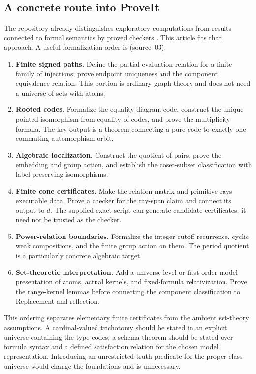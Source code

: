 \documentclass[11pt,letterpaper]{article}
\numberwithin{equation}{section}
\theoremstyle{plain}
\theoremstyle{definition}
\theoremstyle{remark}
\begin{document}
\subsection{A concrete route into ProveIt}

The repository already distinguishes exploratory computations from results
connected to formal semantics by proved checkers \cite{RepoRoot}. This article
fits that approach. A useful formalization order is (source~03):
\begin{enumerate}
\item \textbf{Finite signed paths.} Define the partial evaluation relation
for a finite family of injections; prove endpoint uniqueness and the
component equivalence relation. This portion is ordinary graph theory and
does not need a universe of sets with atoms.
\item \textbf{Rooted codes.} Formalize the equality-diagram code, construct
the unique pointed isomorphism from equality of codes, and prove the
multiplicity formula. The key output is a theorem connecting a pure code
to exactly one commuting-automorphism orbit.
\item \textbf{Algebraic localization.} Construct the quotient of pairs,
prove the embedding and group action, and establish the coset-subset
classification with label-preserving isomorphisms.
\item \textbf{Finite cone certificates.} Make the relation matrix and
primitive rays executable data. Prove a checker for the ray-span claim
and connect its output to $d$. The supplied exact script can generate
candidate certificates; it need not be trusted as the checker.
\item \textbf{Power-relation boundaries.} Formalize the integer cutoff
recurrence, cyclic weak compositions, and the finite group action on them.
The period quotient is a particularly concrete algebraic target.
\item \textbf{Set-theoretic interpretation.} Add a universe-level or
first-order-model presentation of atoms, actual kernels, and fixed-formula
relativization. Prove the range-kernel lemmas before connecting the component
classification to Replacement and reflection.
\end{enumerate}

This ordering separates elementary finite certificates from the ambient
set-theory assumptions. A cardinal-valued trichotomy should be stated in an
explicit universe containing the type codes; a schema theorem should be
stated over formula syntax and a defined satisfaction relation for the chosen
model representation. Introducing an unrestricted truth predicate for the
proper-class universe would change the foundations and is unnecessary.
\end{document}
